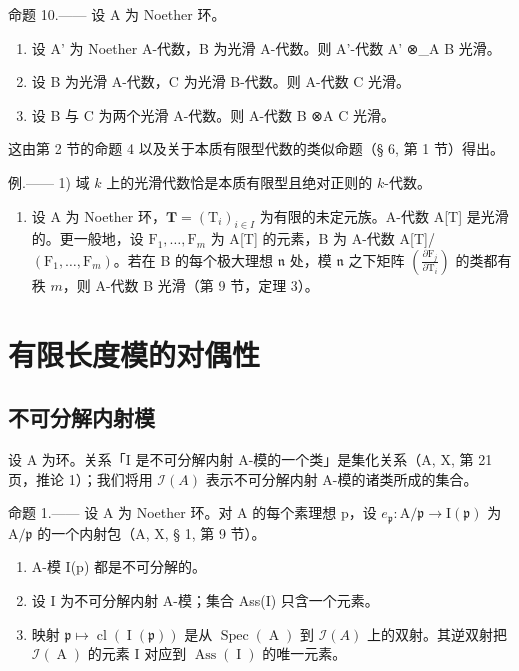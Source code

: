 命题 10.—— 设 A 为 Noether 环。

\begin{enumerate}
\def\labelenumi{\alph{enumi})}
\item
  设 A' 为 Noether A-代数，B 为光滑 A-代数。则 A'-代数 A' ⊗\_A B 光滑。
\item
  设 B 为光滑 A-代数，C 为光滑 B-代数。则 A-代数 C 光滑。
\item
  设 B 与 C 为两个光滑 A-代数。则 A-代数 B ⊗A C 光滑。
\end{enumerate}

这由第 2 节的命题 4 以及关于本质有限型代数的类似命题（§ 6, 第 1 节）得出。

例.—— 1) 域 \(k\) 上的光滑代数恰是本质有限型且绝对正则的 \(k\)-代数。

\begin{enumerate}
\def\labelenumi{\arabic{enumi})}
\setcounter{enumi}{1}
\tightlist
\item
  设 A 为 Noether 环，\(\mathbf{T} = (\mathrm{T}_i)_{i\in I}\) 为有限的未定元族。A-代数 A{[}T{]} 是光滑的。更一般地，设 \(\mathrm{F}_1,\ldots ,\mathrm{F}_m\) 为 A{[}T{]} 的元素，B 为 A-代数 A{[}T{]}/ \((\mathrm{F}_1,\dots ,\mathrm{F}_m)\)。若在 B 的每个极大理想 \(\mathfrak{n}\) 处，模 \(\mathfrak{n}\) 之下矩阵 \(\left(\frac{\partial\mathrm{F}_j}{\partial\mathrm{T}_i}\right)\) 的类都有秩 \(m\)，则 A-代数 B 光滑（第 9 节，定理 3）。
\end{enumerate}

\section{有限长度模的对偶性}

\subsection{不可分解内射模}

设 A 为环。关系「I 是不可分解内射 A-模的一个类」是集化关系（A, X, 第 21 页，推论 1）；我们将用 \(\mathcal{I}(A)\) 表示不可分解内射 A-模的诸类所成的集合。

命题 1.—— 设 A 为 Noether 环。对 A 的每个素理想 p，设 \(e_{\mathfrak{p}}: \mathrm{A}/\mathfrak{p} \to \mathrm{I}(\mathfrak{p})\) 为 \(\mathrm{A}/\mathfrak{p}\) 的一个内射包（A, X, § 1, 第 9 节）。

\begin{enumerate}
\def\labelenumi{\alph{enumi})}
\item
  A-模 I(p) 都是不可分解的。
\item
  设 I 为不可分解内射 A-模；集合 Ass(I) 只含一个元素。
\item
  映射 \(\mathfrak{p} \mapsto \operatorname{cl}(\operatorname{I}(\mathfrak{p}))\) 是从 \(\operatorname{Spec}(\operatorname{A})\) 到 \(\mathcal{I}(A)\) 上的双射。其逆双射把 \(\mathcal{I}(\operatorname{A})\) 的元素 I 对应到 \(\operatorname{Ass}(\operatorname{I})\) 的唯一元素。
\end{enumerate}

